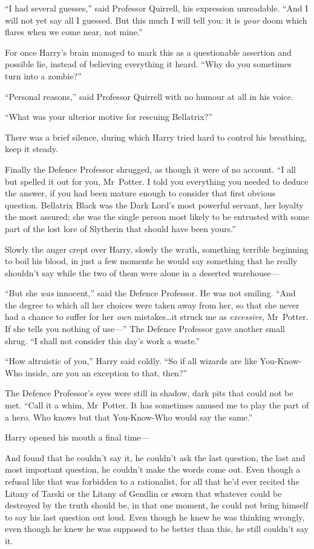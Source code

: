 “I had several guesses,” said Professor Quirrell, his expression unreadable. “And I will not yet say all I guessed. But this much I will tell you: it is \emph{your} doom which flares when we come near, not mine.”

For once Harry’s brain managed to mark this as a questionable assertion and possible lie, instead of believing everything it heard. “Why do you sometimes turn into a zombie?”

“Personal reasons,” said Professor Quirrell with no humour at all in his voice.

“What was your ulterior motive for rescuing Bellatrix?”

There was a brief silence, during which Harry tried hard to control his breathing, keep it steady.

Finally the Defence Professor shrugged, as though it were of no account. “I all but spelled it out for you, Mr~Potter. I told you everything you needed to deduce the answer, if you had been mature enough to consider that first obvious question. Bellatrix Black was the Dark Lord’s most powerful servant, her loyalty the most assured; she was the single person most likely to be entrusted with some part of the lost lore of Slytherin that should have been yours.”

Slowly the anger crept over Harry, slowly the wrath, something terrible beginning to boil his blood, in just a few moments he would say something that he really shouldn’t say while the two of them were alone in a deserted warehouse—

“But she \emph{was} innocent,” said the Defence Professor. He was not smiling. “And the degree to which all her choices were taken away from her, so that she never had a chance to suffer for her \emph{own} mistakes…it struck me as \emph{excessive}, Mr~Potter. If she tells you nothing of use—” The Defence Professor gave another small shrug. “I shall not consider this day’s work a waste.”

“How altruistic of you,” Harry said coldly. “So if all wizards are like You-Know-Who inside, are you an exception to that, then?”

The Defence Professor’s eyes were still in shadow, dark pits that could not be met. “Call it a whim, Mr~Potter. It has sometimes amused me to play the part of a hero. Who knows but that You-Know-Who would say the same.”

Harry opened his mouth a final time—

And found that he couldn’t say it, he couldn’t ask the last question, the last and most important question, he couldn’t make the words come out. Even though a refusal like that was forbidden to a rationalist, for all that he’d ever recited the Litany of Tarski or the Litany of Gendlin or sworn that whatever could be destroyed by the truth should be, in that one moment, he could not bring himself to say his last question out loud. Even though he knew he was thinking wrongly, even though he knew he was supposed to be better than this, he still couldn’t say it.

